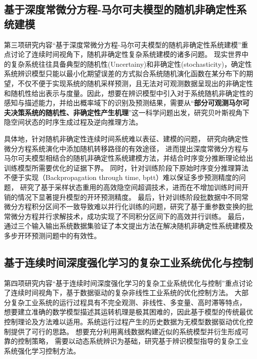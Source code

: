 \subsection{基于深度常微分方程-马尔可夫模型的随机非确定性系统建模}

第三项研究内容“基于深度常微分方程-马尔可夫模型的随机非确定性系统建模”重点讨论了连续时间视角下，随机非确定性复杂系统建模的诸多问题。
现实世界中的复杂系统往往具备典型的随机性(Uncertainy)和非确定性(stochasticity)，确定性系统辨识模型只能以最小化期望误差的方式拟合系统随机演化函数在某分布下的期望，不仅不便于实现系统的随机采样预测，且无法对可观测数据呈现出的非确定性和随机性给出表示与度量。因此，想要在辨识模型中引入对于系统随机非确定性的感知与描述能力，并给出概率域下的识别及预测结果，需要从“\textbf{部分可观测马尔可夫决策系统的随机性、非确定性产生机理}”这一科学问题出发，研究贝叶斯视角下隐空间状态的时序生成过程及逆向推理方法。

具体地，针对随机非确定性连续时间系统难以表征、建模的问题，
研究向确定性微分方程系统演化中添加随机转移路径的有效途径，
进而提出深度常微分方程与马尔可夫模型相结合的随机非确定性系统建模方法，并结合时序变分推断理论给出训练模型所需要优化的证据下界。
同时，针对训练阶段下原始时序变分推理算法不便于实现（Backpropagation through time, bptt）难以保证多步预测精度的问题，
研究了基于采样状态重用的高效隐空间超调技术，进而在不增加训练时间开销的情况下显著提升模型的开环预测精度。
最后，针对训练阶段批数据中不同常微分方程积分区间不一致导致难以并行化训练的问题，研究了基于重参数变换的批常微分方程并行求解技术，成功实现了不同积分区间下的高效并行训练。
最后，通过三个输入输出系统数据集验证了本文提出方法在解决随机非确定性系统建模及多步开环预测问题中的有效性。
\subsection{基于连续时间深度强化学习的复杂工业系统优化与控制}
第四项研究内容“基于连续时间深度强化学习的复杂工业系统优化与控制”重点讨论了连续时间视角下，基于数据驱动的复杂非线性工业系统的优化控制方法。
大部分复杂工业系统的运行过程具有不完全观测、非线性、多变量、高时滞等特点，
想要建立准确的数学模型描述其运转机理是极其困难的，因此基于模型的传统最优控制理论及方法难以适用。系统运行过程产生的历史数据为无模型数据驱动优化控制提供了可行的思路。
想要充分利用离线数据构建近似的系统模型并衍生形成可靠的控制策略，
需要以动态系统辨识为基础，研究基于辨识模型指导的复杂工业系统强化学习控制方法。

